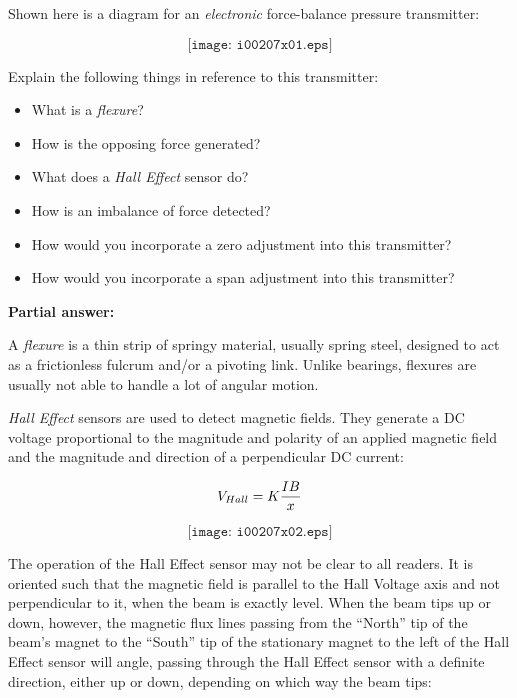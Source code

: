 

Shown here is a diagram for an {\it electronic} force-balance pressure transmitter:

$$\texttt{[image: i00207x01.eps]}$$

Explain the following things in reference to this transmitter:

\begin{itemize}
\item{} What is a {\it flexure}?
\item{} How is the opposing force generated?
\item{} What does a {\it Hall Effect} sensor do?
\item{} How is an imbalance of force detected?
\item{} How would you incorporate a zero adjustment into this transmitter?
\item{} How would you incorporate a span adjustment into this transmitter?
\end{itemize}







\noindent
{\bf Partial answer:}

A {\it flexure} is a thin strip of springy material, usually spring steel, designed to act as a frictionless fulcrum and/or a pivoting link.  Unlike bearings, flexures are usually not able to handle a lot of angular motion.

\vskip 10pt

{\it Hall Effect} sensors are used to detect magnetic fields.  They generate a DC voltage proportional to the magnitude and polarity of an applied magnetic field and the magnitude and direction of a perpendicular DC current:

$$V_{Hall} = K {IB \over x}$$

$$\texttt{[image: i00207x02.eps]}$$

\filbreak

The operation of the Hall Effect sensor may not be clear to all readers.  It is oriented such that the magnetic field is parallel to the Hall Voltage axis and not perpendicular to it, when the beam is exactly level.  When the beam tips up or down, however, the magnetic flux lines passing from the ``North'' tip of the beam's magnet to the ``South'' tip of the stationary magnet to the left of the Hall Effect sensor will angle, passing through the Hall Effect sensor with a definite direction, either up or down, depending on which way the beam tips:

